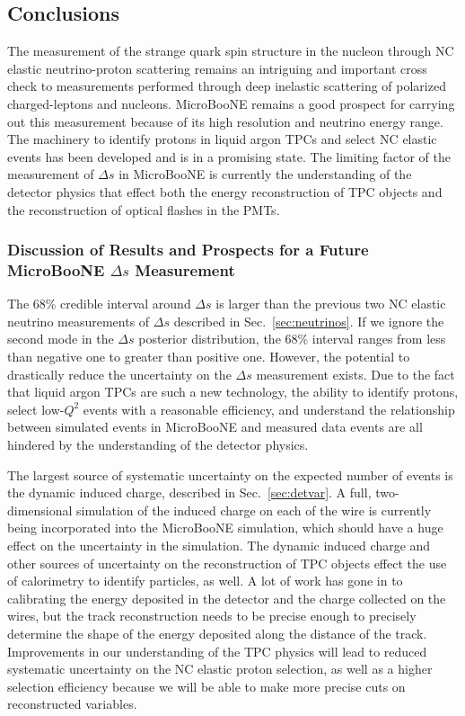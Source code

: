 \subsection{Conclusions}
  The measurement of the strange quark spin structure in the nucleon through NC
  elastic neutrino-proton scattering remains an intriguing and important cross
  check to measurements performed through deep inelastic scattering of
  polarized charged-leptons and nucleons. MicroBooNE remains a good prospect
  for carrying out this measurement because of its high resolution and neutrino
  energy range. The machinery to identify protons in liquid argon TPCs and
  select NC elastic events has been developed and is in a promising state. The
  limiting factor of the measurement of $\Delta s$ in MicroBooNE is currently
  the understanding of the detector physics that effect both the energy
  reconstruction of TPC objects and the reconstruction of optical flashes in
  the PMTs.

  \subsubsection{Discussion of Results and Prospects for a Future MicroBooNE $\Delta s$ Measurement}
    The 68\% credible interval around $\Delta s$ is larger than the previous
    two NC elastic neutrino measurements of $\Delta s$ described in
    Sec.~\ref{sec:neutrinos}. If we ignore the second mode in the $\Delta s$
    posterior distribution, the 68\% interval ranges from less than negative
    one to greater than positive one. However, the potential to drastically
    reduce the uncertainty on the $\Delta s$ measurement exists. Due to the
    fact that liquid argon TPCs are such a new technology, the ability to
    identify protons, select low-$Q^2$ events with a reasonable efficiency, and
    understand the relationship between simulated events in MicroBooNE and
    measured data events are all hindered by the understanding of the detector
    physics.

    The largest source of systematic uncertainty on the expected number of
    events is the dynamic induced charge, described in Sec.~\ref{sec:detvar}. A
    full, two-dimensional simulation of the induced charge on each of the wire
    is currently being incorporated into the MicroBooNE simulation, which
    should have a huge effect on the uncertainty in the simulation. The dynamic
    induced charge and other sources of uncertainty on the reconstruction of
    TPC objects effect the use of calorimetry to identify particles, as well. A
    lot of work has gone in to calibrating the energy deposited in the detector
    and the charge collected on the wires, but the track reconstruction needs
    to be precise enough to precisely determine the shape of the energy
    deposited along the distance of the track. Improvements in our
    understanding of the TPC physics will lead to reduced systematic
    uncertainty on the NC elastic proton selection, as well as a higher
    selection efficiency because we will be able to make more precise cuts on
    reconstructed variables.
    
